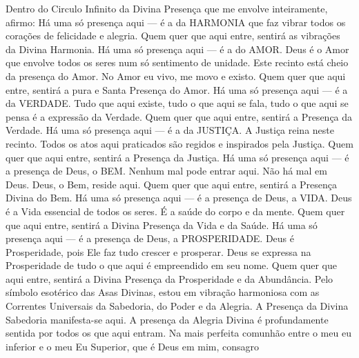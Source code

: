 {\begin{songs}{}
    \sclearpage
      \parspace
      \beginverse
        Dentro do Circulo Infinito da Divina Presença que
        me envolve inteiramente, afirmo:
        \parspace
        Há uma só presença aqui --- é a da HARMONIA que faz
        vibrar todos os corações de felicidade e alegria.
        Quem quer que aqui entre, sentirá as vibrações da
        Divina Harmonia.
        \parspace
        Há uma só presença aqui --- é a do AMOR. Deus é o
        Amor que envolve todos os seres num só sentimento
        de unidade. Este recinto está cheio da presença do
        Amor. No Amor eu vivo, me movo e existo. Quem quer
        que aqui entre, sentirá a pura e Santa Presença do
        Amor.
        \parspace
        Há uma só presença aqui --- é a da VERDADE. Tudo
        que aqui existe, tudo o que aqui se fala, tudo o
        que aqui se pensa é a expressão da Verdade. Quem
        quer que aqui entre, sentirá a Presença da Verdade.
        \parspace
        Há uma só presença aqui --- é a da JUSTIÇA.
        A Justiça reina neste recinto. Todos os atos aqui
        praticados são regidos e inspirados pela Justiça.
        Quem quer que aqui entre, sentirá
        a Presença da Justiça.
        \parspace
        Há uma só presença aqui --- é a presença de Deus,
        o BEM. Nenhum mal pode entrar aqui. Não há mal em
        Deus. Deus, o Bem, reside aqui. Quem quer que aqui
        entre, sentirá a Presença Divina do Bem.
        \parspace
        Há uma só presença aqui --- é a presença de Deus,
        a VIDA. Deus é a Vida essencial de todos os seres.
        É a saúde do corpo e da mente. Quem quer que aqui
        entre, sentirá a Divina Presença da Vida e da Saúde.
        \parspace
        Há uma só presença aqui --- é a presença de Deus,
        a PROSPERIDADE. Deus é Prosperidade, pois Ele faz
        tudo crescer e prosperar. Deus se expressa na
        Prosperidade de tudo o que aqui é empreendido em
        seu nome. Quem quer que aqui entre, sentirá
        a Divina Presença da Prosperidade e da Abundância.
        \parspace
        Pelo símbolo esotérico das Asas Divinas, estou
        em vibração harmoniosa com as Correntes Universais
        da Sabedoria, do Poder e da Alegria. A Presença
        da Divina Sabedoria manifesta-se aqui. A presença
        da Alegria Divina é profundamente sentida por todos
        os que aqui entram.
        \parspace
        Na mais perfeita comunhão entre o meu eu inferior
        e o meu Eu Superior, que é Deus em mim, consagro

\end{songs}}

